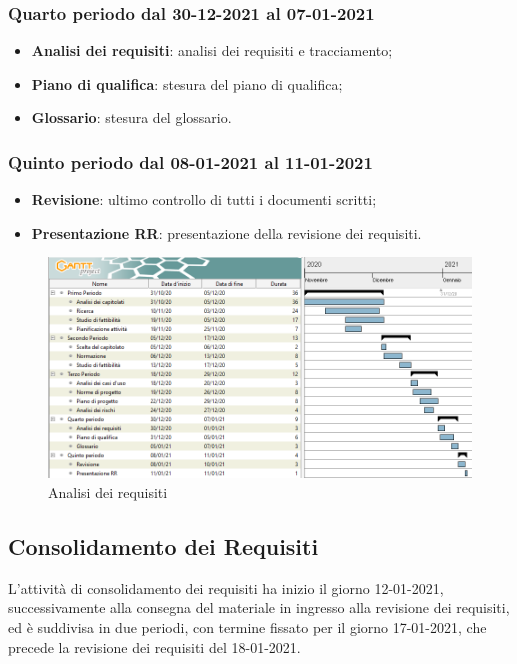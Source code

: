 	\subsubsection{Quarto periodo dal 30-12-2021 al 07-01-2021}
	\begin{itemize}
	\item \textbf{Analisi dei requisiti}: analisi dei requisiti e tracciamento;
	\item \textbf{Piano di qualifica}: stesura del piano di qualifica;
	\item \textbf{Glossario}: stesura del glossario.
	\end{itemize}
	
	\subsubsection{Quinto periodo dal 08-01-2021 al 11-01-2021}
	\begin{itemize}
	\item \textbf{Revisione}: ultimo controllo di tutti i documenti scritti;
	\item \textbf{Presentazione RR}: presentazione della revisione dei requisiti.
	\end{itemize}
	
	
	\newpage
	
	\begin{landscape}
	\begin{figure}[h!]
	\includegraphics[width=24cm]{images/1_Analisi_dei_requisiti.png}
	\caption{Analisi dei requisiti}
	\end{figure}
	\end{landscape}
	
	\newpage
	
	\subsection{Consolidamento dei Requisiti}
	L’attività di consolidamento dei requisiti ha inizio il giorno 12-01-2021, successivamente alla consegna
	del materiale in ingresso alla revisione dei requisiti, ed è suddivisa in due periodi, con termine fissato
	per il giorno 17-01-2021, che precede la revisione dei requisiti del 18-01-2021.
	
